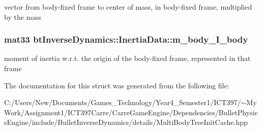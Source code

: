 vector from body-fixed frame to center of mass, in body-fixed frame, multiplied by the mass \hypertarget{structbt_inverse_dynamics_1_1_inertia_data_8812049a71e4002728f5be9d75155fea}{
\subsubsection[m\_\-body\_\-I\_\-body]{\setlength{\rightskip}{0pt plus 5cm}mat33 {\bf btInverseDynamics::InertiaData::m\_\-body\_\-I\_\-body}}}
\label{structbt_inverse_dynamics_1_1_inertia_data_8812049a71e4002728f5be9d75155fea}


moment of inertia w.r.t. the origin of the body-fixed frame, represented in that frame 

The documentation for this struct was generated from the following file:\begin{CompactItemize}
\item 
C:/Users/New/Documents/Games\_\-Technology/Year4\_\-Semester1/ICT397/$\sim$My Work/Assignment1/ICT397Carre/CarreGameEngine/Dependencies/BulletPhysicsEngine/include/BulletInverseDynamics/details/MultiBodyTreeInitCache.hpp\end{CompactItemize}
